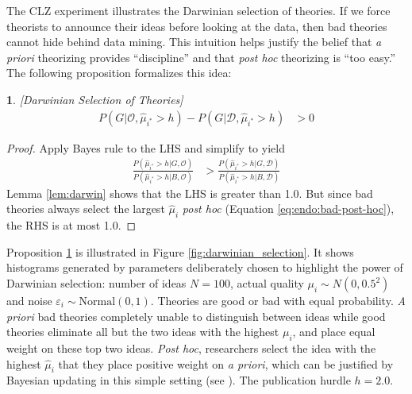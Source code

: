 \documentclass[12pt,english]{article}
\theoremstyle{plain}
\theoremstyle{plain}
\newtheorem{prop}[thm]{\protect\propositionname}
\providecommand{\propositionname}{Proposition}
\providecommand{\propositionname}{Proposition}
\begin{document}
The CLZ experiment illustrates the Darwinian selection of theories. If we force theorists to announce their ideas before looking at the data, then bad theories cannot hide  behind data mining.  This intuition helps justify the belief that \emph{a priori} theorizing provides ``discipline'' and that \emph{post hoc} theorizing is ``too easy.''  The following proposition formalizes this idea:
\begin{prop}\label{prop:darwin}
{[}Darwinian Selection of Theories{]} 
\begin{align*}
P\left(G|\mathcal{O},\hat{\mu}_{i^{\ast}}>h\right)-P\left(G|\mathcal{\mathcal{D}},\hat{\mu}_{i^{\ast}}>h\right) & >0
\end{align*}
\end{prop}

\begin{proof}
Apply Bayes rule to the LHS and simplify to yield
\begin{align*}
\frac{P\left(\hat{\mu}_{i^{\ast}}>h|G,\mathcal{O}\right)}{P\left(\hat{\mu}_{i^{\ast}}>h|B,\mathcal{O}\right)} & >\frac{P\left(\hat{\mu}_{i^{\ast}}>h|G,\mathcal{\mathcal{D}}\right)}{P\left(\hat{\mu}_{i^{\ast}}>h|B,\mathcal{\mathcal{D}}\right)}
\end{align*}
Lemma \ref{lem:darwin} shows that the LHS is greater than 1.0. But since bad theories always select the largest
$\hat{\mu}_{i}$ \emph{post hoc} (Equation \eqref{eq:endo:bad-post-hoc}), the RHS is at most 1.0. 
\end{proof}

Proposition \ref{prop:darwin} is illustrated in Figure \ref{fig:darwinian_selection}. It shows histograms generated by parameters deliberately chosen to highlight the power of Darwinian selection: number of ideas $N=100$, actual quality $\mu_i \sim N(0, 0.5^2)$ and noise $\varepsilon_i \sim \text{Normal}(0, 1)$. Theories are good or bad with equal probability. \emph{A priori} bad theories completely unable to distinguish between ideas while good theories eliminate all but the two ideas with the highest $\mu_i$, and place equal weight on these top two ideas. \emph{Post hoc}, researchers select the idea with the highest $\hat{\mu}_i$ that they place positive weight on \emph{a priori}, which can be justified by Bayesian updating in this simple setting (see \citealt{chen2025high}). The publication hurdle $h=2.0$.
\end{document}
